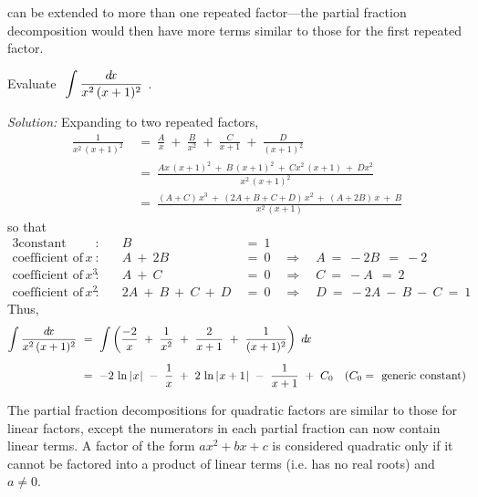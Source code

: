  can be extended to more than one repeated factor---the partial
fraction decomposition would then have more terms similar to those for the
first repeated factor.
\newpage
\begin{exmp}\label{exmp:partfrac3}
\noindent Evaluate $~\displaystyle\int \frac{d\!x}{x^2\,(x+1)^2}~$.\vspace{1mm}
\par\noindent\emph{Solution:} Expanding  to two repeated factors,
\begin{align*}
\frac{1}{x^2\,(x+1)^2} ~&=~ \frac{A}{x} ~+~ \frac{B}{x^2} ~+~ \frac{C}{x+1}
 ~+~ \frac{D}{(x+1)^2}\\[4pt]
&=~ \frac{Ax\,(x+1)^2 ~+~ B\,(x+1)^2 ~+~ Cx^2\,(x+1) ~+~ Dx^2}{x^2\,(x+1)^2}\\[4pt]
&=~ \frac{(A+C)\,x^3 ~+~ (2A+B+C+D)\,x^2 ~+~ (A+2B)\,x ~+~ B}{x^2\,(x+1)}
\end{align*}
so that
\begin{alignat*}{3}
\text{constant term}&: &  B ~&=~ 1\\
\text{coefficient of $x$}&: \quad & A ~+~ 2B ~&=~ 0 \quad\Rightarrow\quad A ~=~ -2B ~~=~ -2\\
\text{coefficient of $x^3$}&: \quad & A ~+~ C ~&=~ 0 \quad\Rightarrow\quad C ~=~ -A ~~=~ 2\\
\text{coefficient of $x^2$}&: \quad & 2A ~+~ B ~+~ C ~+~ D ~&=~ 0
  \quad\Rightarrow\quad D ~=~ -2A ~-~ B ~-~ C ~=~ 1
\end{alignat*}
Thus,
\begin{align*}
\int \frac{d\!x}{x^2\,(x+1)^2} ~&=~ \int \left(\frac{-2}{x} ~+~ \frac{1}{x^2} ~+~
\frac{2}{x+1} ~+~ \frac{1}{(x+1)^2}\right)~d\!x\\[6pt]
&=~ -2\,\ln\,\lvert\mspace{1mu}x\mspace{1mu}\rvert ~-~ \frac{1}{x} ~+~ 2\,\ln\,\lvert\mspace{1mu}x+1\mspace{1mu}\rvert ~-~ \frac{1}{x+1} ~+~ C_0
\quad\text{($C_0 =~$ generic constant)}
\end{align*}
\end{exmp}
\divider
\vspace{2mm}

The partial fraction decompositions for quadratic factors are similar to those
for linear factors, except the numerators in each partial fraction can now
contain linear terms. A factor of the form $ax^2 + bx + c$ is considered
quadratic only if it cannot be factored into a product of linear terms (i.e. has
no real roots) and $a \ne 0$.

